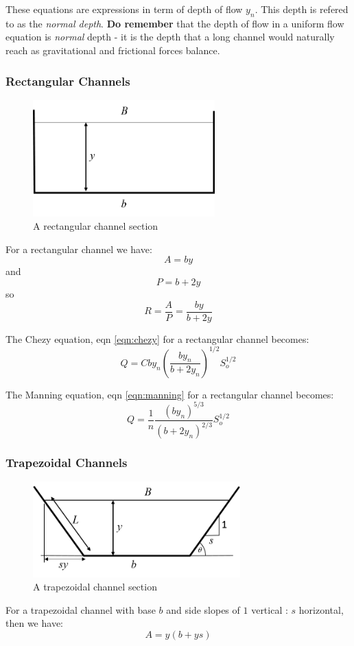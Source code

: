 \documentclass[a4paper, 12pt, british]{article} %
\numberwithin{equation}{section}
\numberwithin{figure}{section}
\numberwithin{table}{section}
\begin{document}
	These equations are expressions in term of depth of flow $y_n$. This depth is refered to as the \textit{normal depth}.  \textbf{Do remember} that the depth of flow in a uniform flow equation is \textit{normal} depth - it is the depth that a long channel would naturally reach as gravitational and frictional forces balance.
	
	\subsubsection*{Rectangular Channels}
	\begin{figure}[H]
		\centering
		\includegraphics[width=7cm]{./images/section_rectangular.png}
		\caption{A rectangular channel section}
		\label{fig:section_rect}
	\end{figure}
	For a rectangular channel we have:
	\[ 
	A = by
	\] 
	and 
	\[
	P = b+2y
	\]
	so
	\[
	R = \frac{A}{P} = \frac{by}{b+2y}
	\]
	
	The Chezy equation, eqn \ref{eqn:chezy} for a rectangular channel becomes:
	\begin{equation}
	Q = C by_n \left( \frac{by_n}{b+2y_n}\right)^{1/2}S_o^{1/2}
	\label{eqn:chezy_sq}
	\end{equation}
	
	The Manning equation, eqn \ref{eqn:manning} for a rectangular channel becomes:
	\begin{equation}
	Q = \frac{1}{n} \frac{(by_n)^{5/3}}{(b+2y_n)^{2/3}} S_o^{1/2} \label{eqn:manning_sq}
	\end{equation}
	
	
	\subsubsection*{Trapezoidal Channels}
	\begin{figure}[H]
		\centering
		\includegraphics[width=8cm]{./images/section_trap_2018_a.png}
		\caption{A trapezoidal channel section}
		\label{fig:section_trap}
	\end{figure}
	For a trapezoidal channel with base $b$ and side slopes of $1$ vertical : $s$ horizontal, then we have:
	\begin{equation*}
	A = y(b+ys)
	\end{equation*}
	
\end{document}
